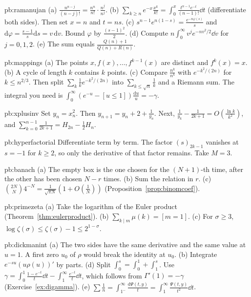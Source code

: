 \begin{hint}{pb:ramanujan}
(a) $\frac{n^{n-j}}{(n-j)!}=\frac{n^n}{n!}\cdot\frac{n^{\underline j}}{n^j}$. (b) $\sum_{k\ge n}e^{-x}\frac{x^k}{k!}=\int_0^x\frac{t^{n-1}e^{-t}}{(n-1)!}\dd t$ (differentiate both sides). Then set $x=n$ and $t=ns$. (c) $s^{n-1}e^{n(1-s)}=\frac{e^{-n\varphi(s)}}s$
and $\mathrm d\varphi=\frac{s-1}s\mathrm ds=v\,\mathrm dv$. Bound $\varphi$ by $\frac{(s-1)^2}2$. (d) Compute $n\int_0^\infty v^je^{-nv^2/2}\dd v$ for $j=0,1,2$. (e) The sum equals
$\frac{Q(n)+1}{Q(n)+R(n)}$.
\end{hint}

\begin{hint}{pb:mappings}
(a) The points $x,f(x),\dots,f^{k-1}(x)$ are distinct and $f^k(x)=x$. (b) A cycle of length $k$ contains $k$ points. (c) Compare $\frac{n^{\underline k}}{n^k}$ with $e^{-k^2/(2n)}$ for $k\le n^{2/3}$. Then split
$\sum_k\frac1ke^{-k^2/(2n)}$ into $\sum_{k\le\sqrt n}\frac1k$ and a Riemann sum. The integral you need is $\int_0^\infty(e^{-u}-[u\le1])\frac{\mathrm du}u=-\gamma$.
\end{hint}

\begin{hint}{pb:xplusinv}
Set $y_n=x_n^2$. Then $y_{n+1}=y_n+2+\frac1{y_n}$. Next, $\frac1{y_k}-\frac1{2k+1}=O(\frac{\ln k}{k^2})$, and $\sum_{k=0}^{n-1}\frac1{2k+1}=H_{2n}-\frac12H_n$.
\end{hint}

\begin{hint}{pb:hyperfactorial}
Differentiate term by term. The factor $(s)_{2k-1}$ vanishes at $s=-1$ for $k\ge2$, so only the derivative of that factor remains. Take $M=3$.
\end{hint}

\begin{hint}{pb:banach}
(a) The empty box is the one chosen for the $(N+1)$-th time, after the other has been chosen $N-r$ times. (b) Sum the relation in $r$. (c) $\binom{2N}N4^{-N}=\frac1{\sqrt{\pi N}}(1+O(\frac1N))$
(Proposition~\ref{prop:binomcoef}).
\end{hint}

\begin{hint}{pb:primezeta}
(a) Take the logarithm of the Euler product (Theorem~\ref{thm:eulerproduct}). (b) $\sum_{k\mid m}\mu(k)=[m=1]$. (c) For $\sigma\ge3$, $\log\zeta(\sigma)\le\zeta(\sigma)-1\le2^{1-\sigma}$.
\end{hint}

\begin{hint}{pb:dickmanint}
(a) The two sides have the same derivative and the same value at $u=1$. A first zero $u_0$ of $\rho$ would break the identity at $u_0$. (b) Integrate $e^{-su}(u\rho(u))'$ by parts.
(d) Split $\int_0^s=\int_0^1+\int_1^s$. Use $\gamma=\int_0^1\frac{1-e^{-t}}t\dd t-\int_1^\infty\frac{e^{-t}}t\dd t$, which follows from $\Gamma'(1)=-\gamma$ (Exercise~\ref{ex:digamma}).
(e) $\sum\frac1n=\int_{1^-}^\infty\frac{\mathrm d\Psi(t,y)}t=\int_1^\infty\frac{\Psi(t,y)}{t^2}\dd t$.
\end{hint}

